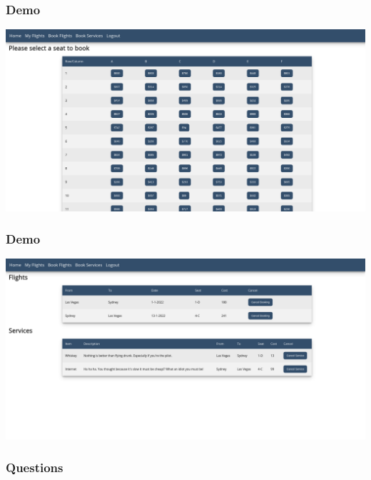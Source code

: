 \documentclass[12pt]{beamer}
\begin{document}
\begin{frame}[plain]
  \frametitle{Demo}
  \includegraphics[width=\textwidth]{seat}
\end{frame}

\begin{frame}[plain]
  \frametitle{Demo}
  \includegraphics[width=\textwidth]{booked}
\end{frame}

\begin{frame}[plain]
  \frametitle{Questions}
\end{frame}
\end{document}
